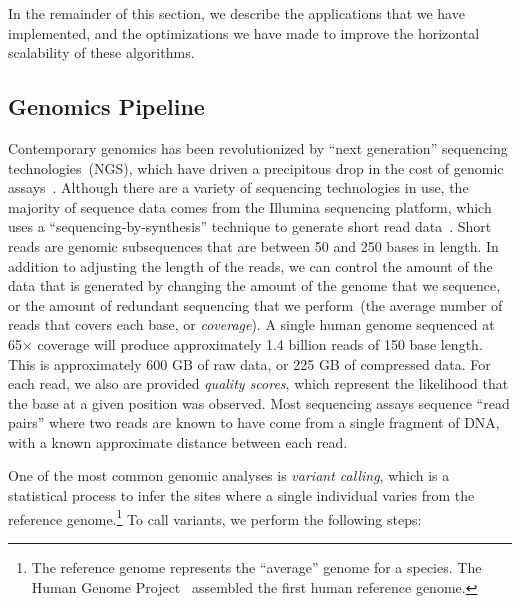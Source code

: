\documentclass{sig-alternate}
\begin{document}
In the remainder of this section, we describe the applications that we have implemented, and the
optimizations we have made to improve the horizontal scalability of these algorithms.

\subsection{Genomics Pipeline}
\label{sec:genomics-pipeline}

Contemporary genomics has been revolutionized by ``next generation'' sequencing
technologies~(NGS), which have \linebreak driven a precipitous drop in the cost of genomic
assays~\cite{nhgri}. Although there are a variety of sequencing technologies in use, the majority of
sequence data comes from the Illumina sequencing platform, which uses a ``sequencing-by-synthesis''
technique to generate short read data~\cite{metzker09}. Short reads are genomic subsequences that
are between 50 and 250 bases in length. In addition to
adjusting the length of the reads, we can control the amount of the data that is generated by
changing the amount of the genome that we sequence, or the amount of redundant sequencing that
we perform~(the average number of reads that covers each base, or \emph{coverage}). A single
human genome sequenced at 65$\times$ coverage will produce approximately 1.4 billion reads of 150 base length.
This is approximately 600 GB of raw data, or 225 GB of compressed data. For each read, we also
are provided \emph{quality scores}, which represent the likelihood that the base at a given position
was observed. Most sequencing assays sequence ``read pairs'' where two reads are known to have
come from a single fragment of DNA, with a known approximate distance between each read.

One of the most common genomic analyses is \emph{variant calling}, which is a statistical process to
infer the sites where a single individual varies from the reference genome.\footnote{The
reference genome represents the ``average'' genome for a species. The Human Genome
Project~\cite{lander01} assembled the first human reference genome.} To call variants, we perform the
following steps:
\end{document}
